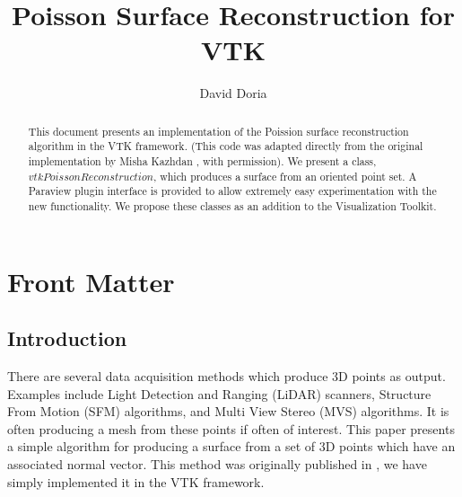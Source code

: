 \documentclass{InsightArticle}
\title{Poisson Surface Reconstruction for VTK}
\author{David Doria}
\newcommand{\IJhandlerIDnumber}{3149}
\begin{document}
%
% 
\IJhandlefooter{\IJhandlerIDnumber}


\ifpdf
\else
\fi


\maketitle


\ifhtml
\chapter*{Front Matter\label{front}}
\fi


\begin{abstract}
\noindent
This document presents an implementation of the Poission surface reconstruction algorithm in the VTK framework. (This code was adapted directly from the original implementation by Misha Kazhdan \cite{reconstruction}, with permission). We present a class, $vtkPoissonReconstruction$, which produces a surface from an oriented point set. A Paraview plugin interface is provided to allow extremely easy experimentation with the new functionality. We propose these classes as an addition to the Visualization Toolkit.

\end{abstract}

\IJhandlenote{\IJhandlerIDnumber}

\tableofcontents

\section{Introduction}
There are several data acquisition methods which produce 3D points as output. Examples include Light Detection and Ranging (LiDAR) scanners, Structure From Motion (SFM) algorithms, and Multi View Stereo (MVS) algorithms. It is often producing a mesh from these points if often of interest. This paper presents a simple algorithm for producing a surface from a set of 3D points which have an associated normal vector. This method was originally published in \cite{reconstruction}, we have simply implemented it in the VTK framework.
\end{document}
